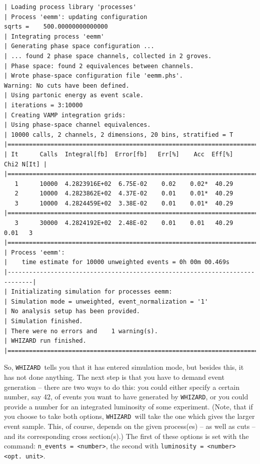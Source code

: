 \documentclass[12pt]{book}
\newcommand{\ttt}[1]{\texttt{#1}}
\newcommand{\whizard}{\texttt{WHIZARD}}
\begin{document}
\begin{footnotesize}
\begin{verbatim}
| Loading process library 'processes'
| Process 'eemm': updating configuration
sqrts =    500.00000000000000
| Integrating process 'eemm'
| Generating phase space configuration ...
| ... found 2 phase space channels, collected in 2 groves.
| Phase space: found 2 equivalences between channels.
| Wrote phase-space configuration file 'eemm.phs'.
Warning: No cuts have been defined.
| Using partonic energy as event scale.
| iterations = 3:10000
| Creating VAMP integration grids:
| Using phase-space channel equivalences.
| 10000 calls, 2 channels, 2 dimensions, 20 bins, stratified = T
|=============================================================================|
| It      Calls  Integral[fb]  Error[fb]   Err[%]    Acc  Eff[%]   Chi2 N[It] |
|=============================================================================|
   1      10000  4.2823916E+02  6.75E-02    0.02    0.02*  40.29
   2      10000  4.2823862E+02  4.37E-02    0.01    0.01*  40.29
   3      10000  4.2824459E+02  3.38E-02    0.01    0.01*  40.29
|=============================================================================|
   3      30000  4.2824192E+02  2.48E-02    0.01    0.01   40.29    0.01   3
|=============================================================================|
| Process 'eemm':
|    time estimate for 10000 unweighted events = 0h 00m 00.469s
|-----------------------------------------------------------------------------|
| Initializating simulation for processes eemm:
| Simulation mode = unweighted, event_normalization = '1'
| No analysis setup has been provided.
| Simulation finished.
| There were no errors and    1 warning(s).
| WHIZARD run finished.
|=============================================================================|
\end{verbatim}
\end{footnotesize}

So, \whizard\ tells you that it has entered simulation mode, but besides
this, it has not done anything. The next step is that you have to
demand event generation -- there are two ways to do this: you could
either specify a certain number, say 42, of events you want to have
generated by \whizard, or you could provide a number for an integrated
luminosity of some experiment. (Note, that if you choose to take both
options, \whizard\ will take the one which gives the larger event
sample. This, of course, depends on the given process(es) -- as well
as cuts -- and its corresponding cross section(s).) The first of these
options is set with the command: \ttt{n\_events = <number>}, the
second with \ttt{luminosity = <number> <opt. unit>}.
\end{document}
